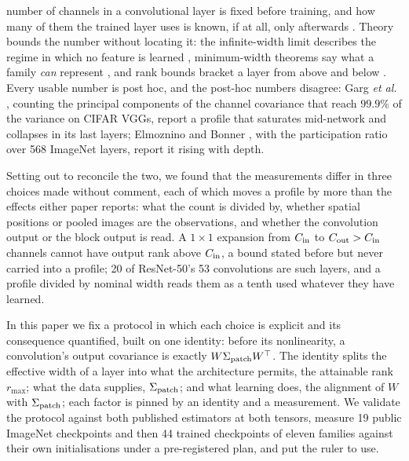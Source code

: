 \documentclass[10pt,journal,compsoc]{IEEEtran}
\begin{document}
\maketitle

\IEEEdisplaynontitleabstractindextext
\IEEEpeerreviewmaketitle



 number of channels in a convolutional layer is fixed
before training, and how many of them the trained layer uses is known,
if at all, only afterwards \cite{garg2019lowEffort,elmoznino2024highDim}.
Theory bounds the number without locating it: the infinite-width limit
describes the regime in which no feature is learned
\cite{jacot2018ntk,lee2020wide}, minimum-width theorems say what a family
\emph{can} represent \cite{park2021minimum}, and rank bounds bracket a
layer from above \cite{han2021rexnet,kim2018rank1} and below
\cite{daneshmand2020bn}. Every usable number is post hoc, and the post-hoc
numbers disagree: Garg \emph{et al.} \cite{garg2019lowEffort}, counting the
principal components of the channel covariance that reach $99.9\%$ of the
variance on CIFAR VGGs, report a profile that saturates mid-network and
collapses in its last layers; Elmoznino and Bonner
\cite{elmoznino2024highDim}, with the participation ratio over
568 ImageNet layers, report it rising with depth.

Setting out to reconcile the two, we found that the measurements differ
in three choices made without comment, each of which moves a profile by
more than the effects either paper reports: what the count is divided by,
whether spatial positions or pooled images are the observations, and
whether the convolution output or the block output is read. A
$1\!\times\!1$ expansion from $C_{\rm in}$ to $C_{\rm out} > C_{\rm in}$
channels cannot have output rank above $C_{\rm in}$, a bound stated before
\cite{han2021rexnet,kim2018rank1} but never carried into a profile; 20 of
ResNet-50's 53 convolutions are such layers, and a profile divided by
nominal width reads them as a tenth used whatever they have learned.

In this paper we fix a protocol in which each choice is explicit and its
consequence quantified, built on one identity: before its nonlinearity, a
convolution's output covariance is exactly $W\Sigma_{\rm patch}W^{\top}$.
The identity splits the effective width of a layer into what the
architecture permits, the attainable rank $r_{\max}$; what the data
supplies, $\Sigma_{\rm patch}$; and what learning does, the alignment of
$W$ with $\Sigma_{\rm patch}$; each factor is pinned by an identity and a
measurement. We validate the protocol against both published
estimators at both tensors, measure 19 public ImageNet checkpoints and
then 44 trained checkpoints of eleven families against their own
initialisations under a pre-registered plan, and put the ruler to use.
\end{document}
